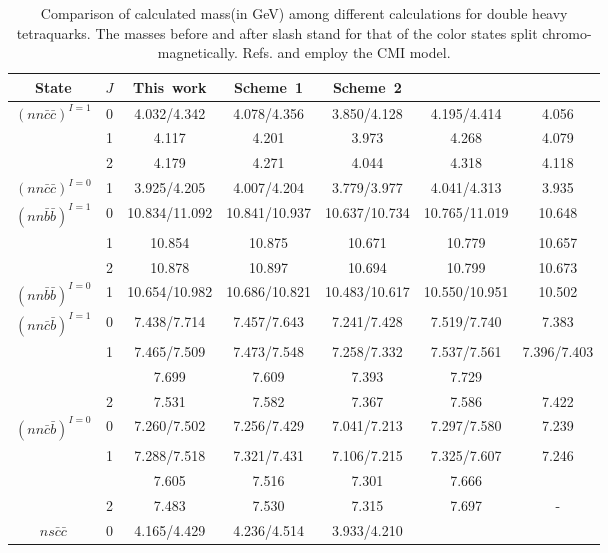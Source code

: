 \documentclass[12pt,prd,onecolumn,floatfix,nofootinbib]{revtex4}
\begin{document}
\renewcommand{\tabcolsep}{0.26cm} \renewcommand{\arraystretch}{1.1}
\begin{table}[!htb]
\caption{Comparison of calculated mass(in GeV) among different calculations
for double heavy tetraquarks. The masses before and after slash stand for
that of the color states split chromo-magnetically. Refs.\protect\cite%
{Luo:2017eub} and \protect\cite{Lu:2020rog} employ the CMI model. }
\label{tab:comparison}%
\begin{tabular}{ccccccc}
\hline\hline
\textrm{State} & $J$ & \textrm{This\ work} & \textrm{Scheme\ 1}\cite%
{Luo:2017eub} & \textrm{Scheme\ 2}\cite{Luo:2017eub} & \cite{Lu:2020rog} &
\cite{Ebert:2007rn} \\ \hline
${(nn\bar{c}\bar{c})}^{I=1}$ & 0 & 4.032/4.342 & 4.078/4.356 & 3.850/4.128 &
4.195/4.414 & 4.056 \\
& 1 & 4.117 & 4.201 & 3.973 & 4.268 & 4.079 \\
& 2 & 4.179 & 4.271 & 4.044 & 4.318 & 4.118 \\
${(nn\bar{c}\bar{c})}^{I=0}$ & 1 & 3.925/4.205 & 4.007/4.204 & 3.779/3.977 &
4.041/4.313 & 3.935 \\
${(nn\bar{b}\bar{b})}^{I=1}$ & 0 & 10.834/11.092 & 10.841/10.937 &
10.637/10.734 & 10.765/11.019 & 10.648 \\
& 1 & 10.854 & 10.875 & 10.671 & 10.779 & 10.657 \\
& 2 & 10.878 & 10.897 & 10.694 & 10.799 & 10.673 \\
${(nn\bar{b}\bar{b})}^{I=0}$ & 1 & 10.654/10.982 & 10.686/10.821 &
10.483/10.617 & 10.550/10.951 & 10.502 \\
${(nn\bar{c}\bar{b})}^{I=1}$ & 0 & 7.438/7.714 & 7.457/7.643 & 7.241/7.428 &
7.519/7.740 & 7.383 \\
& \multirow{2}{*}{1} & 7.465/7.509 & 7.473/7.548 & 7.258/7.332 &
7.537/7.561 & \multirow{2}{*}{7.396/7.403} \\
& & 7.699 & 7.609 & 7.393 & 7.729 & \\
& 2 & 7.531 & 7.582 & 7.367 & 7.586 & 7.422 \\
${(nn\bar{c}\bar{b})}^{I=0}$ & 0 & 7.260/7.502 & 7.256/7.429 & 7.041/7.213 &
7.297/7.580 & 7.239 \\
& \multirow{2}{*}{1} & 7.288/7.518 & 7.321/7.431 & 7.106/7.215 &
7.325/7.607 & \multirow{2}{*}{7.246} \\
& & 7.605 & 7.516 & 7.301 & 7.666 & \\
& 2 & 7.483 & 7.530 & 7.315 & 7.697 & - \\
$ns\bar{c}\bar{c}$ & 0 & 4.165/4.429 & 4.236/4.514 & 3.933/4.210 &

\end{tabular}
\end{table}
\end{document}
